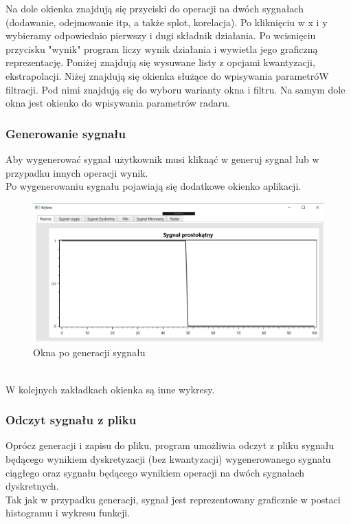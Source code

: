 \documentclass[12pt]{article}
\begin{document}
Na dole okienka znajdują się przyciski do operacji na dwóch sygnałach (dodawanie, odejmowanie itp, a także splot, korelacja). Po kliknięciu w x i y wybieramy odpowiednio pierwszy i dugi składnik działania. Po wcisnięciu przycisku "wynik" program liczy wynik działania i wywietla jego graficzną reprezentację. 
Poniżej znajdują się wysuwane listy z opcjami kwantyzacji, ekstrapolacji. Niżej znajdują się okienka służące do wpisywania parametróW filtracji. Pod nimi znajdują się do wyboru warianty okna i filtru.
Na samym dole okna jest okienko do wpisywania parametrów radaru. 

\subsubsection{Generowanie sygnału}
Aby wygenerować sygnał użytkownik musi kliknąć w generuj sygnał lub w przypadku innych operacji wynik.
\\Po wygenerowaniu sygnału pojawiają się dodatkowe okienko aplikacji.
\begin{figure}[h!]
 \centering
 \includegraphics[width=15.3cm]{prost.PNG}
 \vspace{-0.3cm}
 \caption{Okna po generacji sygnału}
 \label{Widok_aplikacjis}
\end{figure}
\\W kolejnych zakładkach okienka są inne wykresy.

\subsubsection{Odczyt sygnału z pliku}
Oprócz generacji i zapisu do pliku, program umożliwia odczyt z pliku sygnału będącego wynikiem dyskretyzacji (bez kwantyzacji) wygenerowanego
sygnału ciągłego oraz sygnału będącego wynikiem operacji na dwóch sygnałach dyskretnych.
\\Tak jak w przypadku generacji, sygnał jest  reprezentowany graficznie w postaci histogramu i wykresu funkcji.
\end{document}
